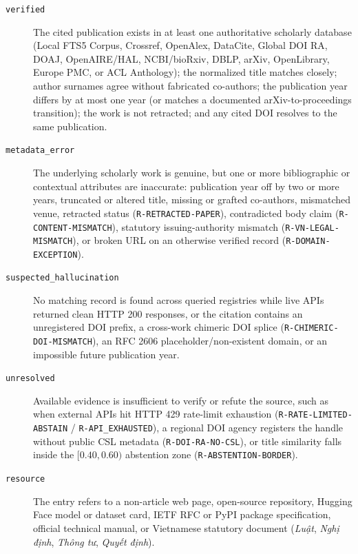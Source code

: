 \begin{description}
    \item[\texttt{verified}] The cited publication exists in at least one authoritative scholarly database (Local FTS5 Corpus, Crossref, OpenAlex, DataCite, Global DOI RA, DOAJ, OpenAIRE/HAL, NCBI/bioRxiv, DBLP, arXiv, OpenLibrary, Europe PMC, or ACL Anthology); the normalized title matches closely; author surnames agree without fabricated co-authors; the publication year differs by at most one year (or matches a documented arXiv-to-proceedings transition); the work is not retracted; and any cited DOI resolves to the same publication.
    \item[\texttt{metadata\_error}] The underlying scholarly work is genuine, but one or more bibliographic or contextual attributes are inaccurate: publication year off by two or more years, truncated or altered title, missing or grafted co-authors, mismatched venue, retracted status (\texttt{R-RETRACTED-PAPER}), contradicted body claim (\texttt{R-CONTENT-MISMATCH}), statutory issuing-authority mismatch (\texttt{R-VN-LEGAL-MISMATCH}), or broken URL on an otherwise verified record (\texttt{R-DOMAIN-EXCEPTION}).
    \item[\texttt{suspected\_hallucination}] No matching record is found across queried registries while live APIs returned clean HTTP 200 responses, or the citation contains an unregistered DOI prefix, a cross-work chimeric DOI splice (\texttt{R-CHIMERIC-DOI-MISMATCH}), an RFC 2606 placeholder/non-existent domain, or an impossible future publication year.
    \item[\texttt{unresolved}] Available evidence is insufficient to verify or refute the source, such as when external APIs hit HTTP 429 rate-limit exhaustion (\texttt{R-RATE-LIMITED-\allowbreak ABSTAIN} / \texttt{R-API\_EXHAUSTED}), a regional DOI agency registers the handle without public CSL metadata (\texttt{R-DOI-RA-NO-CSL}), or title similarity falls inside the $[0.40, 0.60)$ abstention zone (\texttt{R-ABSTENTION-BORDER}).
    \item[\texttt{resource}] The entry refers to a non-article web page, open-source repository, Hugging Face model or dataset card, IETF RFC or PyPI package specification, official technical manual, or Vietnamese statutory document (\textit{Luật}, \textit{Nghị định}, \textit{Thông tư}, \textit{Quyết định}).
\end{description}


